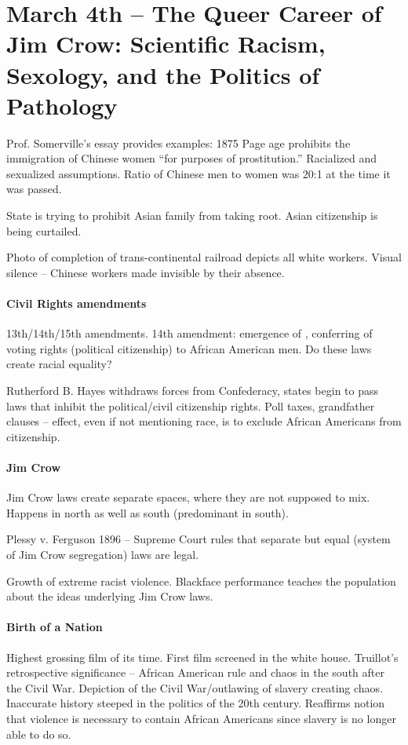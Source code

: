 \section{March 4th -- The Queer Career of Jim Crow: Scientific Racism, Sexology, and the Politics of Pathology}

Prof. Somerville's essay provides examples: 1875 Page age prohibits the immigration of Chinese women ``for purposes of prostitution.'' Racialized and sexualized assumptions. Ratio of Chinese men to women was 20:1 at the time it was passed.

State is trying to prohibit Asian family from taking root. Asian citizenship is being curtailed.

Photo of completion of trans-continental railroad depicts all white workers. Visual silence -- Chinese workers made invisible by their absence.

\paragraph{Civil Rights amendments} 13th/14th/15th amendments. 14th amendment: emergence of , conferring of voting rights (political citizenship) to African American men. Do these laws create racial equality?

Rutherford B. Hayes withdraws forces from Confederacy, states begin to pass laws that inhibit the political/civil citizenship rights. Poll taxes, grandfather clauses -- effect, even if not mentioning race, is to exclude African Americans from citizenship.

\paragraph{Jim Crow} Jim Crow laws create separate spaces, where they are not supposed to mix. Happens in north as well as south (predominant in south).

Plessy v. Ferguson 1896 -- Supreme Court rules that separate but equal (system of Jim Crow segregation) laws are legal.

Growth of extreme racist violence. Blackface performance teaches the population about the ideas underlying Jim Crow laws.

\paragraph{Birth of a Nation} Highest grossing film of its time. First film screened in the white house. Truillot's retrospective significance -- African American rule and chaos in the south after the Civil War. Depiction of the Civil War/outlawing of slavery creating chaos. Inaccurate history steeped in the politics of the 20th century. Reaffirms notion that violence is necessary to contain African Americans since slavery is no longer able to do so.


